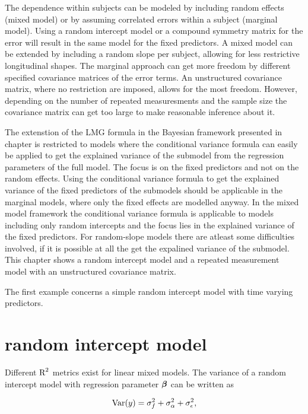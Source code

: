 \documentclass[11pt,a4paper,twoside]{book}\usepackage[]{graphicx}\usepackage[]{color}
\begin{document}
The dependence within subjects can be modeled by including random effects (mixed model) or by assuming correlated errors within a subject (marginal model). Using a random intercept model or a compound symmetry matrix for the error will result in the same model for the fixed predictors. A mixed model can be extended by including a random slope per subject, allowing for less restrictive longitudinal shapes. The marginal approach can get more freedom by different specified covariance matrices of the error terms. An unstructured covariance matrix, where no restriction are imposed, allows for the most freedom. However, depending on the number of repeated measuresments and the sample size the covariance matrix can get too large to make reasonable inference about it. 


The extenstion of the LMG formula in the Bayesian framework presented in chapter is restricted to models where the conditional variance formula can easily be applied to get the explained variance of the submodel from the regression parameters of the full model. The focus is on the fixed predictors and not on the random effects. Using the conditional variance formula to get the explained variance of the fixed predictors of the submodels should be applicable in the marginal models, where only the fixed effects are modelled anyway. In the mixed model framework the conditional variance formula is applicable to models including only random intercepts and the focus lies in the explained variance of the fixed predictors. For random-slope models there are atleast some difficulties involved, if it is possible at all the get the expalined variance of the submodel. This chapter shows a  random intercept model and a repeated measurement model with an unstructured covariance matrix.  

The first example concerns a simple random intercept model with time varying predictors.  

\section{random intercept model}

Different $\text{R}^2$ metrics exist for linear mixed models. The variance of a random intercept model with regression parameter ${\boldsymbol{\beta}}$ can be written as

      \begin{align} 
        \operatorname{Var}(y) = \sigma_{f}^2  + \sigma_{\alpha}^2 + \sigma_{\epsilon}^2, 
        \end{align}
\end{document}
